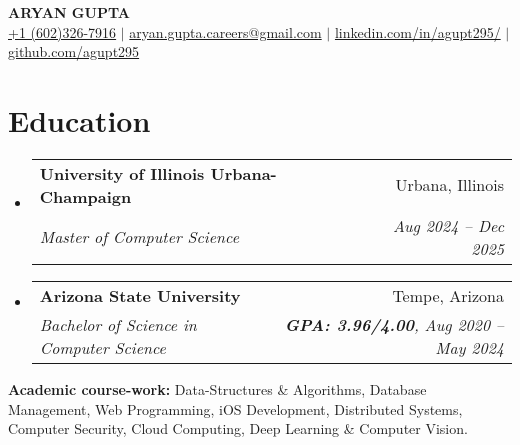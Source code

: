 \documentclass[letterpaper,11pt]{article}
\makeatletter
\newcommand{\resumeEducationHeading}[5]{
  \vspace{-2pt}\item
    \begin{tabular*}{0.97\textwidth}[t]{l@{\extracolsep{\fill}}r}
      \textbf{#1} & #2 \\
      \textit{\small#3} & \textit{\small #4#5} \\
    \end{tabular*}\vspace{-5pt}
}
\newcommand{\resumeSubHeadingListStart}{\begin{itemize}[leftmargin=0.15in, label={}]}
\newcommand{\resumeSubHeadingListEnd}{\end{itemize}}
\makeatother
\begin{document}
\begin{center}
  \textbf{\Huge \scshape ARYAN GUPTA} \\ \vspace{3pt} 
  \small
  \faMobile \hspace{.5pt} \href{tel:6023267916}{+1 (602)326-7916}
  $|$
  \faAt \hspace{.5pt} \href{mailto:aryan.gupta.careers@gmail.com}{aryan.gupta.careers@gmail.com}
  $|$
  \faLinkedinSquare \hspace{.5pt} \href{https://www.linkedin.com/in/agupt295}{{\color{blue}linkedin.com/in/agupt295/}}
  $|$
  \faGithub \hspace{.5pt} \href{https://github.com/agupt295}{{\color{blue}github.com/agupt295}}
\end{center}

\section{\color[rgb]{0.25, 0.41, 0.88} Education}
\resumeSubHeadingListStart
  \resumeEducationHeading
    {University of Illinois Urbana-Champaign}{Urbana, Illinois}
    {Master of Computer Science}{Aug 2024 -- Dec 2025}{}{}
\resumeSubHeadingListEnd
\vspace{-0.35cm} %
\resumeSubHeadingListStart
  \resumeEducationHeading
    {Arizona State University}{Tempe, Arizona}
    {Bachelor of Science in Computer Science}{\textbf{GPA: 3.96/4.00}}{, Aug 2020 -- May 2024}{}
\resumeSubHeadingListEnd

  \resumeSubHeadingListStart
    \small{\item{
        \textbf{Academic course-work:}{ Data-Structures \& Algorithms, Database Management, Web Programming, iOS Development, Distributed Systems, Computer Security, Cloud Computing, Deep Learning \& Computer Vision.} \\ \vspace{3pt}
    }}
  \resumeSubHeadingListEnd

\end{document}

